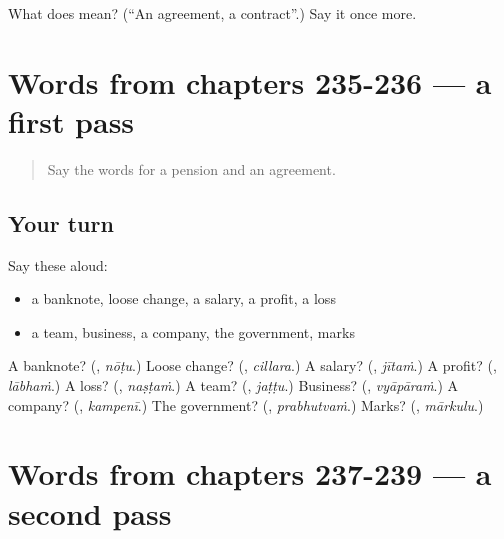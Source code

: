 \begin{tcolorbox}[breakable,colback=teal!4,colframe=teal!35!black,title={Before you move on}]
What does  mean? (\textquotedblleft{}An agreement, a contract\textquotedblright{}.) Say it once more.
\end{tcolorbox}
\section[(dialogue)]{Words from chapters 235-236 — a first pass}

\label{lesson:TE-R239-first-pass-words-from-chapters-235-236}



\begin{quote}
Say the words for a pension and an agreement.
\end{quote}

\subsection*{Your turn}
Say these aloud:

\begin{itemize}
\raggedright
  \item a banknote, loose change, a salary, a profit, a loss
  \item a team, business, a company, the government, marks
\end{itemize}

\begin{tcolorbox}[breakable,colback=teal!4,colframe=teal!35!black,title={Before you move on}]
A banknote? (\textbf{}, \emph{nōṭu}.) Loose change? (\textbf{}, \emph{cillara}.) A salary? (\textbf{}, \emph{jītaṁ}.) A profit? (\textbf{}, \emph{lābhaṁ}.) A loss? (\textbf{}, \emph{naṣṭaṁ}.) A team? (\textbf{}, \emph{jaṭṭu}.) Business? (\textbf{}, \emph{vyāpāraṁ}.) A company? (\textbf{}, \emph{kampenī}.) The government? (\textbf{}, \emph{prabhutvaṁ}.) Marks? (\textbf{}, \emph{mārkulu}.)
\end{tcolorbox}
\section[(dialogue)]{Words from chapters 237-239 — a second pass}

\label{lesson:TE-R239-second-pass-words-from-chapters-237-239}



